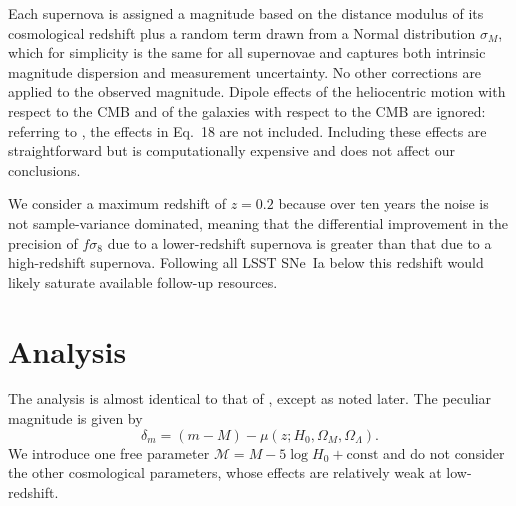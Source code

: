 \documentclass{aastex62}   	%
\begin{document}
Each supernova is assigned a magnitude based on the distance modulus of its cosmological
redshift plus a random term drawn from a Normal distribution $\sigma_M$, which for simplicity is the same for all supernovae and captures both
intrinsic magnitude dispersion and measurement uncertainty.  No other corrections are applied to the observed magnitude.  Dipole effects of the heliocentric
motion with respect to the CMB and of the galaxies with respect to the CMB  are ignored: referring to
\citet{2011ApJ...741...67D}, the effects in Eq.~18 are not included.  Including these effects are straightforward but is computationally expensive
and does not affect our conclusions.

We consider a maximum redshift of $z=0.2$ because over ten years the noise is not sample-variance dominated, meaning that the differential improvement
in the precision of
$f\sigma_8$ due to a lower-redshift supernova is greater than that due to a high-redshift supernova.  Following all LSST SNe~Ia below this redshift 
would likely saturate available follow-up resources.


\section{Analysis}
The analysis is  almost identical to that of \citet{2015JCAP...12..033H, 2017JCAP...05..015H}, except as noted later.  
The peculiar magnitude is given by 
\begin{equation}
\delta_m=(m - M) - \mu(z;H_0, \Omega_M, \Omega_\Lambda).
\label{data:eqn}
\end{equation}  We introduce one free parameter 
$\mathcal{M} = M - 5\log{H_0} + \text{const}$ and do not consider the other cosmological parameters, whose effects are relatively weak at low-redshift.
\end{document}
